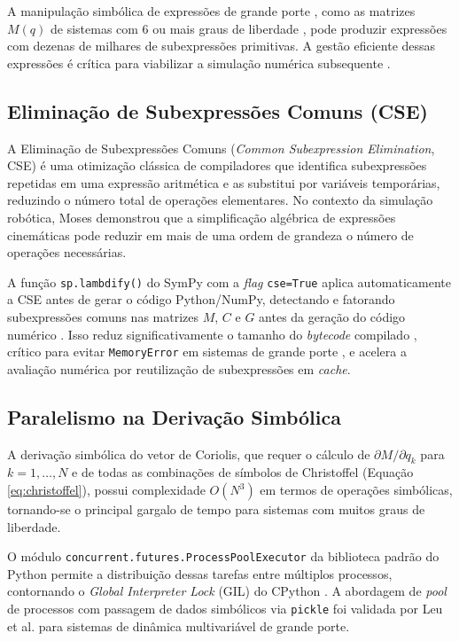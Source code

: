 A manipulação simbólica de expressões de grande porte , como as matrizes $M(q)$ de sistemas com 6 ou mais graus de liberdade , pode produzir expressões com dezenas de milhares de subexpressões primitivas. A gestão eficiente dessas expressões é crítica para viabilizar a simulação numérica subsequente \cite{leu1986automated}.

\subsection{Eliminação de Subexpressões Comuns (CSE)}

A Eliminação de Subexpressões Comuns (\textit{Common Subexpression Elimination}, CSE) é uma otimização clássica de compiladores \cite{alfred2007compilers} que identifica subexpressões repetidas em uma expressão aritmética e as substitui por variáveis temporárias, reduzindo o número total de operações elementares. No contexto da simulação robótica, Moses \cite{moses1971algebraic} demonstrou que a simplificação algébrica de expressões cinemáticas pode reduzir em mais de uma ordem de grandeza o número de operações necessárias.

A função \texttt{sp.lambdify()} do SymPy com a \textit{flag} \texttt{cse=True} aplica automaticamente a CSE antes de gerar o código Python/NumPy, detectando e fatorando subexpressões comuns nas matrizes $M$, $C$ e $G$ antes da geração do código numérico \cite{meurer2017sympy}. Isso reduz significativamente o tamanho do \textit{bytecode} compilado , crítico para evitar \texttt{MemoryError} em sistemas de grande porte , e acelera a avaliação numérica por reutilização de subexpressões em \textit{cache}.

\subsection{Paralelismo na Derivação Simbólica}

A derivação simbólica do vetor de Coriolis, que requer o cálculo de $\partial M / \partial q_k$ para $k = 1, \ldots, N$ e de todas as combinações de símbolos de Christoffel (Equação \eqref{eq:christoffel}), possui complexidade $O(N^3)$ em termos de operações simbólicas, tornando-se o principal gargalo de tempo para sistemas com muitos graus de liberdade.

O módulo \texttt{concurrent.futures.ProcessPoolExecutor} da biblioteca padrão do Python permite a distribuição dessas tarefas entre múltiplos processos, contornando o \textit{Global Interpreter Lock} (GIL) do CPython \cite{beazley2010understanding}. A abordagem de \textit{pool} de processos com passagem de dados simbólicos via \texttt{pickle} foi validada por Leu et al. \cite{leu1986automated} para sistemas de dinâmica multivariável de grande porte.

